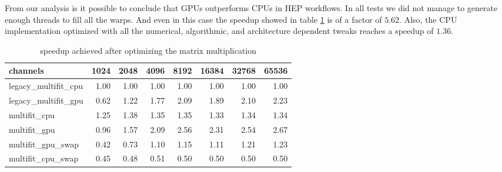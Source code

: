 From our analysis is it possible to conclude that GPUs outperforms CPUs in HEP workflows. In all tests we did not manage to generate enough threads to fill all the warps. And even in this case the speedup showed in table \ref{tab:speedup} is of a factor of $5.62$. Also, the CPU implementation optimized with all the numerical, algorithmic, and architecture dependent tweaks reaches a speedup of $1.36$.  
\begin{table}[h]
  \caption{speedup achieved after optimizing the matrix multiplication}
  \label{tab:speedup}
\begin{tabular}{lrrrrrrr}
\toprule
channels &  1024  &  2048  &  4096  &  8192  &  16384 &  32768 &  65536 \\
\midrule
legacy\_multifit\_cpu &   1.00 &   1.00 &   1.00 &   1.00 &   1.00 &   1.00 &   1.00 \\
legacy\_multifit\_gpu &   0.62 &   1.22 &   1.77 &   2.09 &   1.89 &   2.10 &   2.23 \\
multifit\_cpu        &   1.25 &   1.38 &   1.35 &   1.35 &   1.33 &   1.34 &   1.34 \\
multifit\_gpu        &   0.96 &   1.57 &   2.09 &   2.56 &   2.31 &   2.54 &   2.67 \\
multifit\_gpu\_swap   &   0.42 &   0.73 &   1.10 &   1.15 &   1.11 &   1.21 &   1.23 \\
multifit\_cpu\_swap   &   0.45 &   0.48 &   0.51 &   0.50 &   0.50 &   0.50 &   0.50 \\
\bottomrule
\end{tabular}
\end{table}
